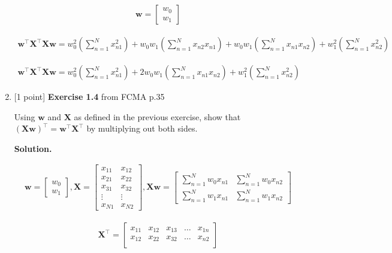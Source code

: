 \documentclass[10pt]{article}
\begin{document}
\begin{enumerate}
\begin{eqnarray*}
\mathbf{w} = 
    \begin{bmatrix}
    w_0 \\[0.3em]
    w_1
    \end{bmatrix}
\end{eqnarray*}    

\begin{eqnarray*}
\mathbf{w}^\top\mathbf{X}^\top\mathbf{X}\mathbf{w}  = 
	w_0^2({\sum_{n=1}^N x_{n1}^2}) + w_0 w_1({\sum_{n=1}^N x_{n2} x_{n1}}) + w_0 w_1({\sum_{n=1}^N x_{n1} x_{n2}}) + w_1^2 ({\sum_{n=1}^N x_{n2}^2})
\end{eqnarray*}

\begin{eqnarray*}
\mathbf{w}^\top\mathbf{X}^\top\mathbf{X}\mathbf{w}  = 
	w_0^2({\sum_{n=1}^N x_{n1}^2}) + 2w_0 w_1({\sum_{n=1}^N x_{n1} x_{n2}}) + w_1^2 ({\sum_{n=1}^N x_{n2}^2})
\end{eqnarray*}


\item \label{prob:4} [1 point]
{\bf Exercise 1.4} from FCMA p.35

Using $\mathbf{w}$ and $\mathbf{X}$ as defined in the previous exercise, show that ${(\mathbf{X}\mathbf{w})}^\top = {\mathbf{w}}^\top{\mathbf{X}}^\top$ by multiplying out both sides.

{\bf Solution.} 

\begin{eqnarray*}
    \mathbf{w} = 
    \begin{bmatrix}
    w_0 \\[0.3em]
    w_1
    \end{bmatrix}
    ,
	\mathbf{X} = 
    \begin{bmatrix}
    x_{11} & x_{12} \\[0.3em]
    x_{21} & x_{22} \\[0.3em]
    x_{31} & x_{32} \\[0.3em]
    \vdots & \vdots \\[0.3em]
    x_{N1} & x_{N2}
    \end{bmatrix}
    ,
    \mathbf{Xw} =
    \begin{bmatrix}
    {\sum_{n=1}^N w_0 x_{n1}} & {\sum_{n=1}^N w_0 x_{n2}} \\[0.3em]
    {\sum_{n=1}^N w_1 x_{n1}} & {\sum_{n=1}^N w_1 x_{n2}}
    \end{bmatrix}
\end{eqnarray*}

\begin{eqnarray*}    
    \mathbf{X}^\top = 
    \begin{bmatrix}
    x_{11} & x_{12} & x_{13} & \dots & x_{1n} \\[0.3em]
    x_{12} & x_{22} & x_{32} & \dots & x_{n2} \\[0.3em]
    \end{bmatrix}
\end{eqnarray*}


\end{enumerate}
\end{document}
